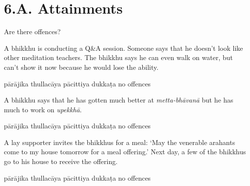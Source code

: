 \chapter{6.A. Attainments}
\renewcommand*{\theChapterTitle}{6.A. Attainments}

\begin{exam}{\autoExamName}

\begin{problem*}

  Are there offences?

\begin{parts}

\item A bhikkhu is conducting a Q\&A session.
  Someone says that he doesn't look like other meditation teachers.
  The bhikkhu says he can even walk on water, but can't show it now because he would lose the ability.

  \bigskip

  \begin{answers}{5}
    \bChoices
     pārājika\eAns
     thullacāya\eAns
     pācittiya\eAns
     dukkaṭa\eAns
     no offences\eAns
    \eChoices
  \end{answers}

  \bigskip

\item A bhikkhu says that he has gotten much better at \emph{metta-bhāvanā} but
  he has much to work on \textit{upekkhā}.

  \bigskip

  \begin{answers}{5}
    \bChoices
     pārājika\eAns
     thullacāya\eAns
     pācittiya\eAns
     dukkaṭa\eAns
     no offences\eAns
    \eChoices
  \end{answers}

  \bigskip

\item A lay supporter invites the bhikkhus for a meal: `May the venerable
  arahants come to my house tomorrow for a meal offering.' Next day, a few of
  the bhikkhus go to his house to receive the offering.

  \bigskip

  \begin{answers}{5}
    \bChoices
     pārājika\eAns
     thullacāya\eAns
     pācittiya\eAns
     dukkaṭa\eAns
     no offences\eAns
    \eChoices
  \end{answers}


\end{parts}
\end{problem*}
\end{exam}
